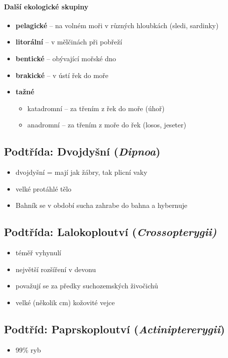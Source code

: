 \paragraph{Další ekologické skupiny}
\begin{itemize}
\item \textbf{pelagické} -- na volném moři v různých hloubkách (sledi, sardinky)
\item \textbf{litorální} -- v mělčinách při pobřeží
\item \textbf{bentické} -- obývající mořské dno
\item \textbf{brakické} -- v ústí řek do moře
\item \textbf{tažné}
	\begin{itemize}
	\item katadromní -- za třením z řek do moře (úhoř)
	\item anadromní -- za třením z moře do řek (losos, jeseter)
	\end{itemize}
\end{itemize}


\subsection{Podtřída: Dvojdyšní (\textit{Dipnoa})}
\begin{itemize}
\item dvojdyšní = mají jak žábry, tak plicní vaky
\item velké protáhlé tělo
\item Bahník se v období sucha zahrabe do bahna a hybernuje
\end{itemize}

\subsection{Podtřída: Lalokoploutví (\textit{Crossopterygii)}}
\begin{itemize}
\item téměř vyhynulí
\item největší rozšíření v devonu
\item považují se za předky suchozemských živočichů
\item velké (několik cm) kožovité vejce
\end{itemize}

\subsection{Podtříd: Paprskoploutví (\textit{Actiniptererygii})}
\begin{itemize}
\item 99\% ryb
\end{itemize}

